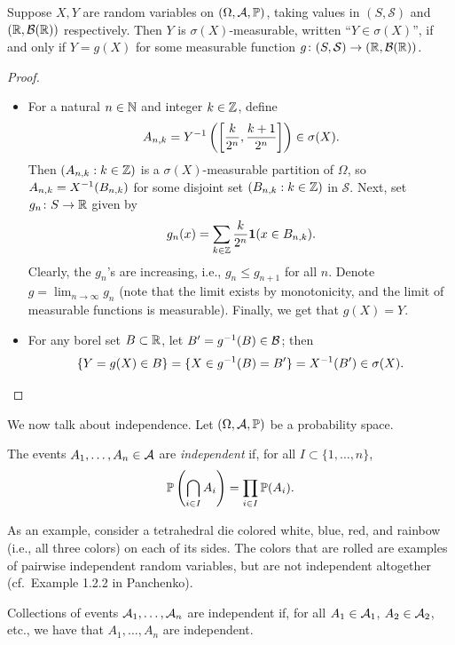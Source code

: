 \newpage
\begin{lemma}[Panchenko 1.4] \label{lem:transport_of_measure}
    Suppose $X, Y$ are random variables on $(\Omega, \mathcal A, \mathbb P)$, taking values in $(S, \mathcal S)$ and $(\mathbb R, \mathcal B(\mathbb R))$ respectively. Then $Y$ is $\sigma(X)$-measurable, written ``$Y \in \sigma(X)$'', if and only if $Y = g(X)$ for some measurable function $g \colon (S, \mathcal S) \to (\mathbb R, \mathcal B(\mathbb R))$.
\end{lemma}
\begin{proof}
    \begin{itemize}
        \item[($\Rightarrow$)] For a natural $n \in \mathbb N$ and integer $k \in \mathbb Z$, define
        \[ A_{n,k} = Y^{-1} \left(\left[\frac{k}{2^n}, \frac{k+1}{2^n}\right]\right) \in \sigma(X). \]
        Then $(A_{n,k} : k \in \mathbb Z)$ is a $\sigma(X)$-measurable partition of $\Omega$, so $A_{n,k} = X^{-1}(B_{n,k})$ for some disjoint set $(B_{n,k} : k \in \mathbb Z)$ in $\mathcal S$. Next, set $g_n \colon S \to \mathbb R$ given by
        \[ g_n(x) = \sum_{k \in \mathbb Z} \frac{k}{2^n} \mathbf 1(x \in B_{n,k}). \]
        Clearly, the $g_n$'s are increasing, i.e., $g_n \leq g_{n+1}$ for all $n$. Denote $g = \lim_{n \to \infty} g_n$ (note that the limit exists by monotonicity, and the limit of measurable functions is measurable). Finally, we get that $g(X) = Y$.
        \item[($\Leftarrow$)] For any borel set $B \subset \mathbb R$, let $B' = g^{-1}(B) \in \mathcal B$; then
        \[ \{Y = g(X) \in B\} = \{X \in g^{-1}(B) = B'\} = X^{-1}(B') \in \sigma(X). \qedhere \]
    \end{itemize}
\end{proof}

We now talk about independence. Let $(\Omega, \mathcal A, \mathbb P)$ be a probability space.
\begin{definition} \label{defn:independence}
    The events $A_1, \dots, A_n \in \mathcal A$ are \textit{independent} if, for all $I \subset \{1, \dots, n\}$,
    \[ \mathbb P\left(\bigcap_{i \in I} A_i\right) = \prod_{i \in I} \mathbb P(A_i). \]
\end{definition} \vspace{-8pt}
As an example, consider a tetrahedral die colored white, blue, red, and rainbow (i.e., all three colors) on each of its sides. The colors that are rolled are examples of pairwise independent random variables, but are not independent altogether (cf.\ Example 1.2.2 in Panchenko).

\begin{definition} \label{defn:independence_for_collections}
    Collections of events $\mathcal A_1, \dots, \mathcal A_n$ are independent if, for all $A_1 \in \mathcal A_1$, $A_2 \in \mathcal A_2$, etc., we have that $A_1, \dots, A_n$ are independent.
\end{definition}

